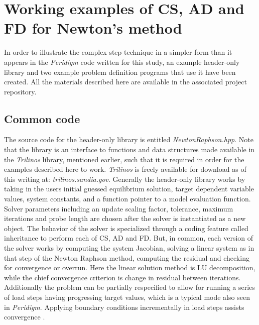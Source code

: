 \documentclass[preprint,12pt]{elsarticle}
\begin{document}
\section{Working examples of CS, AD and FD for Newton's method}
\label{sec:WorkingExamples}

In order to illustrate the complex-step technique in a simpler form than it
appears in the \emph{Peridigm} code written for this study, an example
header-only library and two example problem definition programs that use it
have been created. All the materials described here are available in the
associated project repository.

\subsection{Common code} 
\label{subsec:CommonCode} 

The source code for the header-only library is entitled
\emph{NewtonRaphson.hpp}. Note that the library is an interface to functions and
data structures made available in the \emph{Trilinos} library, mentioned
earlier, such that it is required in order for the examples described here
to work. \emph{Trilinos} is freely available for download as of this
writing at: \emph{trilinos.sandia.gov}.  Generally the header-only library
works by taking in the users initial guessed equilibrium solution, target
dependent variable values, system constants, and a function pointer to a
model evaluation function. Solver parameters including an update scaling
factor, tolerance, maximum iterations and probe length are chosen after the
solver is instantiated as a new object. The behavior of the solver is
specialized through a coding feature called inheritance to perform each of
CS, AD and FD.  But, in common, each version of the solver works by
computing the system Jacobian, solving a linear system as in that step of
the Newton Raphson method, computing the residual and checking for
convergence or overrun. Here the linear solution method is LU
decomposition, while the chief convergence criterion is change in residual
between iterations.  Additionally the problem can be partially respecified
to allow for running a series of load steps having progressing target
values, which is a typical mode also seen in \emph{Peridigm}. Applying
boundary conditions incrementally in load steps assists convergence
\cite{rezaiee2010dynamic}.
\end{document}
